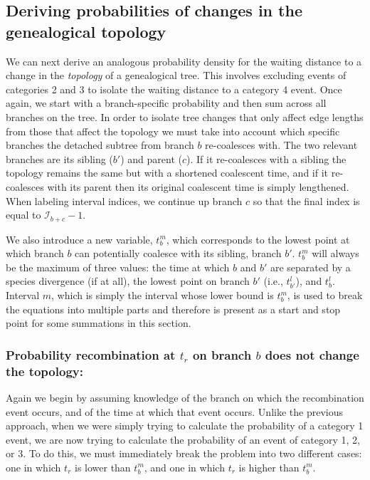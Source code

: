 \documentclass[11pt]{article}
\begin{document}
\subsection{Deriving probabilities of changes in the genealogical topology}

We can next derive an analogous probability density for the waiting distance 
to a change in the \emph{topology} of a genealogical tree. This involves excluding 
events of categories 2 and 3 to isolate the waiting distance to a category 4 event. 
Once again, we start with a branch-specific probability and then sum across all 
branches on the tree. In order to isolate tree changes that only affect edge
lengths from those that affect the topology we must take into account which 
specific branches the detached subtree from branch $b$ re-coalesces with. 
The two relevant branches are its sibling ($b'$) and parent ($c$). If it re-coalesces
with a sibling the topology remains the same but with a shortened 
coalescent time, and if it re-coalesces with its parent then its 
original coalescent time is simply lengthened. 
When labeling interval indices, we continue up branch $c$ so that the final index 
is equal to $\mathcal{I}_{b+c}-1$. 

We also introduce a new variable, $t_b^m$, which corresponds to the lowest point
at which branch $b$ can potentially coalesce with its sibling, branch $b'$. 
$t_b^m$ will always be the maximum of three values: the time at which $b$ and 
$b'$ are separated by a species divergence (if at all), the lowest point on 
branch $b'$ (i.e., $t_{b'}^l$), and $t_b^l$. Interval
$m$, which is simply the interval whose lower bound is $t_b^m$, is used to break 
the equations into multiple parts and therefore is present as a start and 
stop point for some summations in this section.

\subsubsection{Probability recombination at $t_r$ on branch $b$ does not change the topology:}

Again we begin by assuming knowledge of the branch on which the recombination event occurs, and of the time at which that event occurs. Unlike the previous approach, when we were simply trying to calculate the probability of a category 1 event, we are now trying to calculate the probability of an event of category 1, 2, or 3. To do this, we must immediately break the problem into two different cases: one in which $t_r$ is lower than $t_b^m$, and one in which $t_r$ is higher than $t_b^m$.
\end{document}
